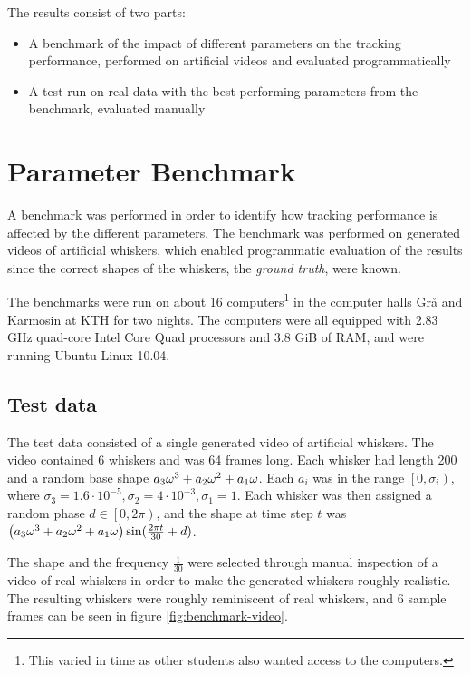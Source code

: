 The results consist of two parts:
\begin{itemize}
\item A benchmark of the impact of different parameters on the
  tracking performance, performed on artificial videos and evaluated
  programmatically
\item A test run on real data with the best performing parameters from
  the benchmark, evaluated manually
\end{itemize}

\section{Parameter Benchmark}

A benchmark was performed in order to identify how tracking
performance is affected by the different parameters. The benchmark was
performed on generated videos of artificial whiskers, which enabled
programmatic evaluation of the results since the correct shapes of the
whiskers, the \emph{ground truth}, were known.

The benchmarks were run on about 16 computers\footnote{This varied in
  time as other students also wanted access to the computers.} in the
computer halls Grå and Karmosin at KTH for two nights. The computers
were all equipped with 2.83 GHz quad-core Intel\textregistered \;
Core\texttrademark {} Quad processors and 3.8 GiB of RAM, and were
running Ubuntu Linux 10.04.

\subsection{Test data}
\label{sec:test-data}

The test data consisted of a single generated video of artificial
whiskers. The video contained 6 whiskers and was 64 frames long. Each
whisker had length 200 and a random base shape $a_3\omega^3 + a_2\omega^2 + a_1\omega$. Each
$a_i$ was in the range $\left[0, \sigma_i\right)$, where $\sigma_3 =
1.6 \cdot 10^{-5}, \sigma_2 = 4\cdot 10^{-3}, \sigma_1 = 1$. Each
whisker was then assigned a random phase $d \in \left[0, 2\pi\right)$,
and the shape at time step $t$ was $\left(a_3\omega^3 + a_2\omega^2 + a_1\omega\right)
\sin(\frac{2\pi t}{30} + d)$.

The shape and the frequency $\frac{1}{30}$ were selected through
manual inspection of a video of real whiskers in order to make the
generated whiskers roughly realistic. The resulting whiskers were
roughly reminiscent of real whiskers, and 6 sample frames can be seen
in figure \ref{fig:benchmark-video}.

